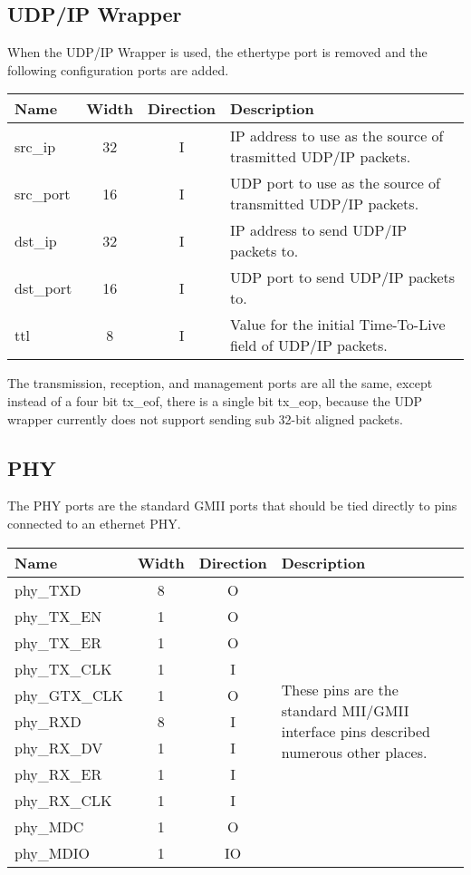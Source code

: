 \documentclass[11pt]{article}
\begin{document}
\subsection{UDP/IP Wrapper}

When the UDP/IP Wrapper is used, the ethertype port is removed and the
following configuration ports are added.

\vskip 12pt\noindent\begin{tabular}{p{0.85in}ccp{4.0in}}
\hline
Name & Width & Direction & Description \\
\hline

\hline src\_ip & 32 & I & IP address to use as the source of
trasmitted UDP/IP packets. \\

\hline src\_port & 16 & I & UDP port to use as the source of
transmitted UDP/IP packets. \\

\hline dst\_ip & 32 & I & IP address to send UDP/IP packets to. \\

\hline dst\_port & 16 & I & UDP port to send UDP/IP packets to. \\

\hline ttl & 8 & I & Value for the initial Time-To-Live field of
UDP/IP packets. \\

\hline
\end{tabular}\vskip 12pt

The transmission, reception, and management ports are all the same,
except instead of a four bit tx\_eof, there is a single bit tx\_eop,
because the UDP wrapper currently does not support sending sub 32-bit
aligned packets. 

\subsection{PHY}

The PHY ports are the standard GMII ports that should be tied directly
to pins connected to an ethernet PHY.

\begin{tabular}{p{0.85in}ccp{4.0in}}
\hline
Name & Width & Direction & Description \\
\hline

phy\_TXD      & 8 & O & \multirow{11}{4.0in}{These pins are the standard
  MII/GMII interface pins described numerous other places.} \\
phy\_TX\_EN   & 1 & O & \\
phy\_TX\_ER   & 1 & O & \\ 
phy\_TX\_CLK  & 1 & I & \\
phy\_GTX\_CLK & 1 & O & \\
phy\_RXD      & 8 & I & \\
phy\_RX\_DV   & 1 & I & \\
phy\_RX\_ER   & 1 & I & \\
phy\_RX\_CLK  & 1 & I & \\
phy\_MDC      & 1 & O & \\
phy\_MDIO     & 1 & IO & \\
\hline
\end{tabular}
\end{document}

